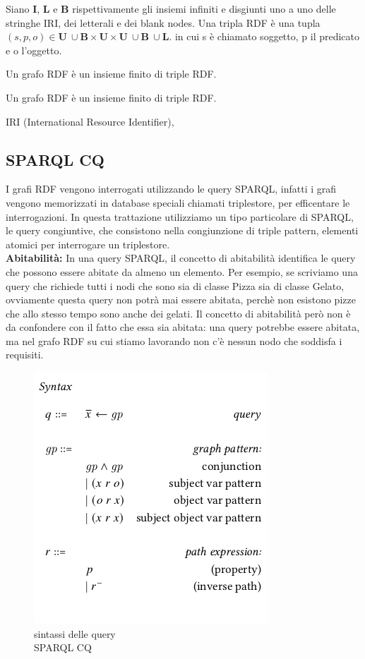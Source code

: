 \begin{definition}
	Siano \textbf{I}, \textbf{L} e \textbf{B} rispettivamente gli insiemi infiniti e disgiunti uno a uno delle stringhe IRI, dei letterali e dei blank nodes. Una tripla RDF è una tupla $(s, p, o) \in \textbf{U}\ \cup \textbf{B} \times \textbf{U} \times \textbf{U}\ \cup \textbf{B}\ \cup \textbf{L}.$ in cui s è chiamato soggetto, p il predicato e o l'oggetto.
\end{definition}
\begin{definition}
	Un grafo RDF è un insieme finito di triple RDF.
\end{definition}
\begin{definition}
	Un grafo RDF è un insieme finito di triple RDF.
\end{definition}
IRI (International Resource Identifier),

\subsection{SPARQL CQ}
I grafi RDF vengono interrogati utilizzando le query SPARQL, infatti i grafi vengono memorizzati in database speciali chiamati triplestore, per efficentare le interrogazioni. In questa trattazione utilizziamo un tipo particolare di SPARQL, le query congiuntive, che consistono nella congiunzione di triple pattern, elementi atomici per interrogare un triplestore. \\
\textbf{Abitabilità: } In una query SPARQL, il concetto di abitabilità identifica le query che possono essere abitate da almeno un elemento. Per esempio, se scriviamo una query che richiede tutti i nodi che sono sia di classe Pizza sia di classe Gelato, ovviamente questa query non potrà mai essere abitata, perchè non esistono pizze che allo stesso tempo sono anche dei gelati. Il concetto di abitabilità però non è da confondere con il fatto che essa sia abitata: una query potrebbe essere abitata, ma nel grafo RDF su cui stiamo lavorando non c'è nessun nodo che soddisfa i requisiti. \ 
\begin{figure}[H]
    \centering
    \includegraphics[scale=0.6]{pictures/leinbergSyntax}
    \caption{sintassi delle query \\ SPARQL CQ}
    \label{fig:leinbergerSyntax}
\end{figure}
\newpage
